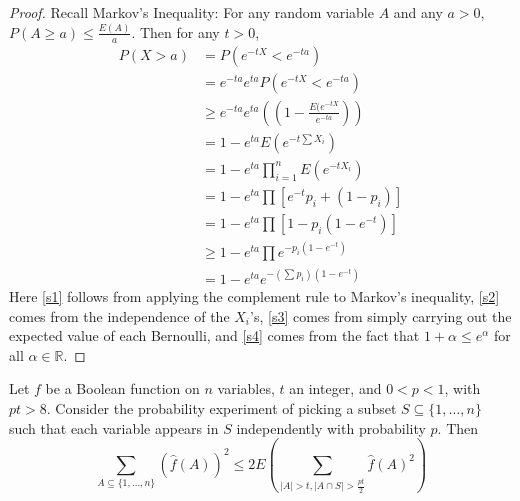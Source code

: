 \begin{proof}
	Recall Markov's Inequality: For any random variable $A$ and any $a>0$, $P(A \geq a) \leq \frac{E(A)}{a}$. Then for any $t > 0$,
	\begin{align*}
		P(X > a) &= P(e^{-tX} < e^{-ta}) \\
		&= e^{-ta}e^{ta}P(e^{-tX} < e^{-ta}) \\
		&\geq e^{-ta}e^{ta}\left( (1-\frac{E(e^{-tX}}{e^{-ta}}) \right) \label{s1}\tag{1} \\
		&= 1-e^{ta}E(e^{-t\sum X_i}) \\
		&= 1-e^{ta}\prod_{i=1}^nE(e^{-tX_i}) \label{s2}\tag{2} \\
		&= 1-e^{ta}\prod[e^{-t}p_i + (1-p_i)] \label{s3}\tag{3} \\
		&= 1-e^{ta}\prod[1-p_i(1-e^{-t})] \\
		&\geq 1-e^{ta}\prod e^{-p_i(1-e^{-t})} \label{s4}\tag{4} \\
		&= 1-e^{ta}e^{-(\sum p_i)(1-e^{-t})}
	\end{align*}
	Here \eqref{s1} follows from applying the complement rule to Markov's inequality, \eqref{s2} comes from the independence of the $X_i$'s, \eqref{s3} comes from simply carrying out the expected value of each Bernoulli, and \eqref{s4} comes from the fact that $1+\alpha \leq e^{\alpha}$ for all $\alpha \in \mathbb{R}$. 
\end{proof}
\begin{lemma}
	Let $f$ be a Boolean function on $n$ variables, $t$ an integer, and $0 < p < 1$, with $pt > 8$. Consider the probability experiment of picking a subset $S \subseteq \{1,\ldots,n\}$ such that each variable appears in $S$ independently with probability $p$. Then 
	\[ \sum_{A \subseteq \{1,\ldots,n\}} (\hat{f}(A))^2 \leq 2E\left( \sum_{ |A| > t, |A \cap S| > \frac{pt}{2}} \hat{f}(A)^2 \right) \]
\end{lemma}
